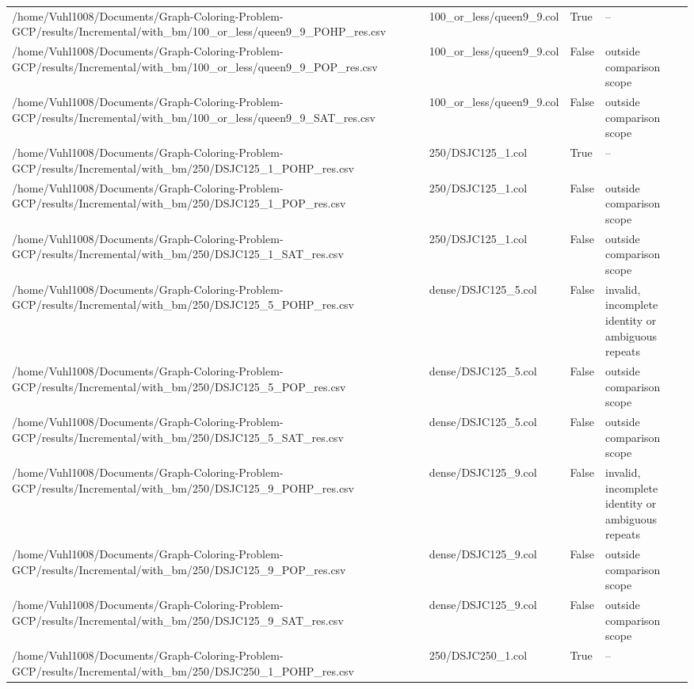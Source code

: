 \begin{table}[htbp]
\begin{tabular}{llll}
/home/Vuhl1008/Documents/Graph-Coloring-Problem-GCP/results/Incremental/with\_bm/100\_or\_less/queen9\_9\_POHP\_res.csv & 100\_or\_less/queen9\_9.col & True & -- \\
/home/Vuhl1008/Documents/Graph-Coloring-Problem-GCP/results/Incremental/with\_bm/100\_or\_less/queen9\_9\_POP\_res.csv & 100\_or\_less/queen9\_9.col & False & outside comparison scope \\
/home/Vuhl1008/Documents/Graph-Coloring-Problem-GCP/results/Incremental/with\_bm/100\_or\_less/queen9\_9\_SAT\_res.csv & 100\_or\_less/queen9\_9.col & False & outside comparison scope \\
/home/Vuhl1008/Documents/Graph-Coloring-Problem-GCP/results/Incremental/with\_bm/250/DSJC125\_1\_POHP\_res.csv & 250/DSJC125\_1.col & True & -- \\
/home/Vuhl1008/Documents/Graph-Coloring-Problem-GCP/results/Incremental/with\_bm/250/DSJC125\_1\_POP\_res.csv & 250/DSJC125\_1.col & False & outside comparison scope \\
/home/Vuhl1008/Documents/Graph-Coloring-Problem-GCP/results/Incremental/with\_bm/250/DSJC125\_1\_SAT\_res.csv & 250/DSJC125\_1.col & False & outside comparison scope \\
/home/Vuhl1008/Documents/Graph-Coloring-Problem-GCP/results/Incremental/with\_bm/250/DSJC125\_5\_POHP\_res.csv & dense/DSJC125\_5.col & False & invalid, incomplete identity or ambiguous repeats \\
/home/Vuhl1008/Documents/Graph-Coloring-Problem-GCP/results/Incremental/with\_bm/250/DSJC125\_5\_POP\_res.csv & dense/DSJC125\_5.col & False & outside comparison scope \\
/home/Vuhl1008/Documents/Graph-Coloring-Problem-GCP/results/Incremental/with\_bm/250/DSJC125\_5\_SAT\_res.csv & dense/DSJC125\_5.col & False & outside comparison scope \\
/home/Vuhl1008/Documents/Graph-Coloring-Problem-GCP/results/Incremental/with\_bm/250/DSJC125\_9\_POHP\_res.csv & dense/DSJC125\_9.col & False & invalid, incomplete identity or ambiguous repeats \\
/home/Vuhl1008/Documents/Graph-Coloring-Problem-GCP/results/Incremental/with\_bm/250/DSJC125\_9\_POP\_res.csv & dense/DSJC125\_9.col & False & outside comparison scope \\
/home/Vuhl1008/Documents/Graph-Coloring-Problem-GCP/results/Incremental/with\_bm/250/DSJC125\_9\_SAT\_res.csv & dense/DSJC125\_9.col & False & outside comparison scope \\
/home/Vuhl1008/Documents/Graph-Coloring-Problem-GCP/results/Incremental/with\_bm/250/DSJC250\_1\_POHP\_res.csv & 250/DSJC250\_1.col & True & -- \\

\end{tabular}
\end{table}
